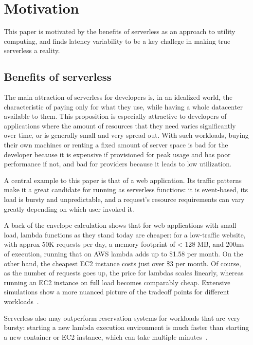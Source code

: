 \section{Motivation}\label{motivation}

This paper is motivated by the benefits of serverless as an approach to utility
computing, and finds latency variability to be a key challege in making true
serverless a reality.

\subsection{Benefits of serverless}

The main attraction of serverless for developers is, in an idealized world, the
characteristic of paying only for what they use, while having a whole datacenter
available to them. This proposition is especially attractive to developers of
applications where the amount of resources that they need varies significantly
over time, or is generally small and very spread out. With such workloads,
buying their own machines or renting a fixed amount of server space is bad for
the developer because it is expensive if provisioned for peak usage and has poor
performance if not, and bad for providers because it leads to low utilization.

A central example to this paper is that of a web application. Its traffic
patterns make it a great candidate for running as serverless functions: it is
event-based, its load is bursty and unpredictable, and a request's resource
requirements can vary greatly depending on which user invoked it.


A back of the envelope calculation shows that for web applications with small
load, lambda functions as they stand today are cheaper: for a low-traffic
website, with approx 50K requests per day, a memory footprint of < 128 MB, and
200ms of execution, running that on AWS lambda adds up to \$1.58 per month. On
the other hand, the cheapest EC2 instance costs just over \$3 per month. Of
course, as the number of requests goes up, the price for lambdas scales
linearly, whereas running an EC2 instance on full load becomes comparably cheap.
Extensive simulations show a more nuanced picture of the tradeoff points for
different workloads~\cite{econ-of-serverless,trek10-blog}.

Serverless also may outperform reservation systems for workloads that are very
bursty: starting a new lambda execution environment is much faster than starting
a new container or EC2 instance, which can take multiple
minutes~\cite{ec2-autoscaling}.


